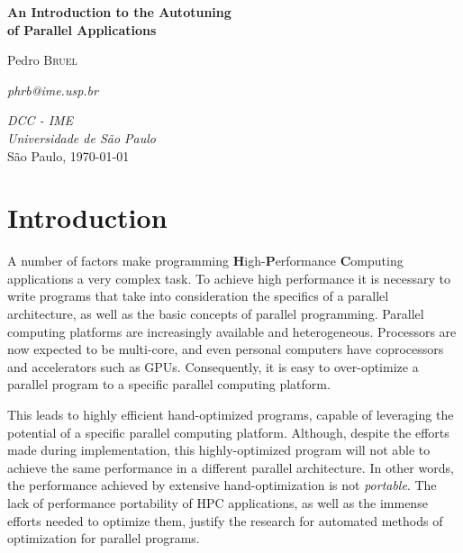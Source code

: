 \documentclass[a4paper, 12pt]{article}
\begin{document}
\hypersetup{backref,pdfpagemode=FullScreen,colorlinks=true}

\thispagestyle{empty}
\begin{center}
    \vspace*{4cm}
    \textbf{\Large{An Introduction to the Autotuning\\of Parallel Applications}}\\

    \vskip 1cm

    Pedro \textsc{Bruel}

    \emph{phrb@ime.usp.br}

    \vfill
    \normalsize{\emph{DCC - IME\\
    Universidade de São Paulo}\\}
    \normalsize{São Paulo, \today}
\end{center}

\newpage

\tableofcontents

\newpage

\section{Introduction} \label{sec:intro}

A number of factors make programming \textbf{H}igh-\textbf{P}erformance
\textbf{C}omputing applications a very complex task. To achieve high
performance it is necessary to write programs that take into consideration
the specifics of a parallel architecture, as well as the basic concepts
of parallel programming. Parallel computing platforms are increasingly
available and heterogeneous. Processors are now expected to be multi-core,
and even personal computers have coprocessors and accelerators such as
GPUs. Consequently, it is easy to over-optimize a parallel program to
a specific parallel computing platform.

This leads to highly efficient hand-optimized programs, capable of leveraging
the potential of a specific parallel computing platform. Although, despite the
efforts made during implementation, this highly-optimized program will not able
to achieve the same performance in a different parallel architecture. In other
words, the performance achieved by extensive hand-optimization is
not \emph{portable}. The lack of performance portability of HPC applications,
as well as the immense efforts needed to optimize them, justify the research
for automated methods of optimization for parallel programs.
\end{document}
